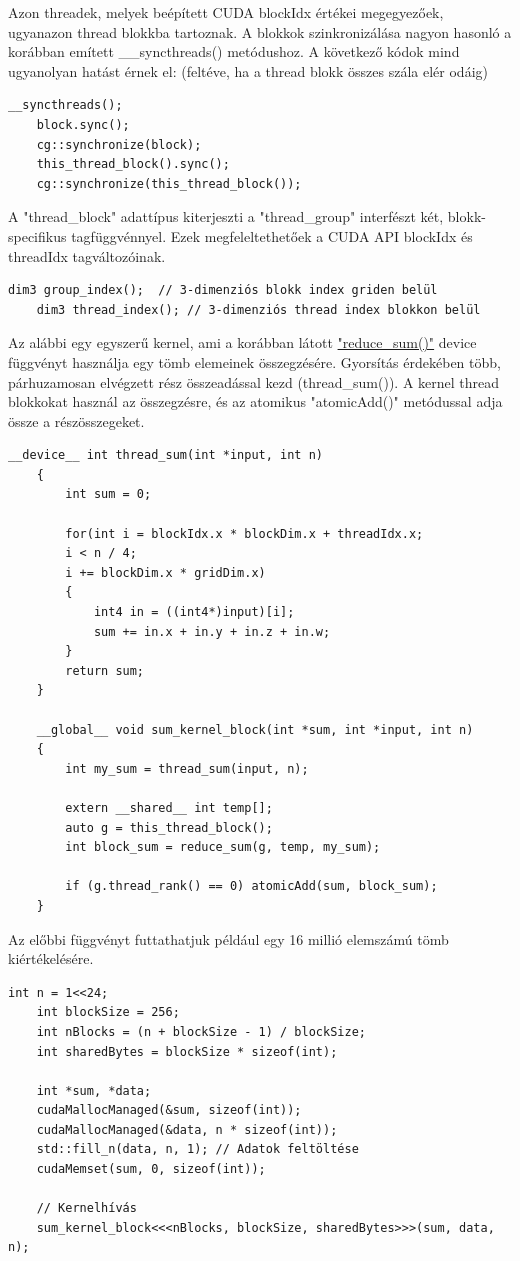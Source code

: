Azon threadek, melyek beépített CUDA blockIdx értékei megegyezőek, ugyanazon thread blokkba tartoznak. A blokkok szinkronizálása nagyon hasonló a korábban emített \_\_syncthreads() metódushoz. A következő kódok mind ugyanolyan hatást érnek el: (feltéve, ha a thread blokk összes szála elér odáig)
\begin{lstlisting}[style=CStyle]
	__syncthreads();
	block.sync();
	cg::synchronize(block);
	this_thread_block().sync();
	cg::synchronize(this_thread_block());
\end{lstlisting}

A "thread\_block" adattípus kiterjeszti a "thread\_group" interfészt két, blokk-specifikus tagfüggvénnyel. Ezek megfeleltethetőek a CUDA API blockIdx és threadIdx tagváltozóinak.
\begin{lstlisting}[style=CStyle]
	dim3 group_index();  // 3-dimenziós blokk index griden belül
	dim3 thread_index(); // 3-dimenziós thread index blokkon belül
\end{lstlisting}

Az alábbi egy egyszerű kernel, ami a korábban látott \hyperlink{reducesum}{"reduce\_sum()"} device függvényt használja egy tömb elemeinek összegzésére. Gyorsítás érdekében több, párhuzamosan elvégzett rész összeadással kezd (thread\_sum()). A kernel thread blokkokat használ az összegzésre, és az atomikus "atomicAdd()" metódussal adja össze a részösszegeket.

\begin{lstlisting}[style=CStyle]
	__device__ int thread_sum(int *input, int n) 
	{
		int sum = 0;
		
		for(int i = blockIdx.x * blockDim.x + threadIdx.x;
		i < n / 4; 
		i += blockDim.x * gridDim.x)
		{
			int4 in = ((int4*)input)[i];
			sum += in.x + in.y + in.z + in.w;
		}
		return sum;
	}
	
	__global__ void sum_kernel_block(int *sum, int *input, int n)
	{
		int my_sum = thread_sum(input, n);
		
		extern __shared__ int temp[];
		auto g = this_thread_block();
		int block_sum = reduce_sum(g, temp, my_sum);
		
		if (g.thread_rank() == 0) atomicAdd(sum, block_sum);
	}
\end{lstlisting}

Az előbbi függvényt futtathatjuk például egy 16 millió elemszámú tömb kiértékelésére.
\begin{lstlisting}[style=CStyle]
	int n = 1<<24;
	int blockSize = 256;
	int nBlocks = (n + blockSize - 1) / blockSize;
	int sharedBytes = blockSize * sizeof(int);
	
	int *sum, *data;
	cudaMallocManaged(&sum, sizeof(int));
	cudaMallocManaged(&data, n * sizeof(int));
	std::fill_n(data, n, 1); // Adatok feltöltése
	cudaMemset(sum, 0, sizeof(int));
	
	// Kernelhívás
	sum_kernel_block<<<nBlocks, blockSize, sharedBytes>>>(sum, data, n);
\end{lstlisting}


